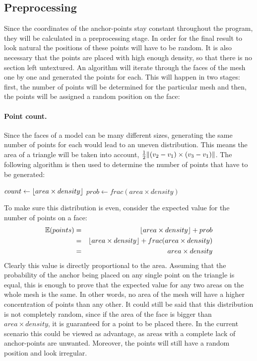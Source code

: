 \documentclass[a4paper, 12pt]{article}
\DeclarePairedDelimiter{\norm}{\lVert}{\rVert}
\DeclarePairedDelimiter{\floor}{\lfloor}{\rfloor}
\begin{document}
\subsection{Preprocessing}

Since the coordinates of the anchor-points stay constant throughout the program, they will be calculated in a preprocessing stage. In order for the final result to look natural the positions of these points will have to be random. It is also necessary that the points are placed with high enough density, so that there is no section left untextured. An algorithm will iterate through the faces of the mesh one by one and generated the points for each. This will happen in two stages: first, the number of points will be determined for the particular mesh and then, the points will be assigned a random position on the face:

\paragraph{Point count.}
Since the faces of a model can be many different sizes, generating the same number of points for each would lead to an uneven distribution. This means the area of a triangle will be taken into account, $\frac{1}{2}\norm{(v_2-v_1) \times (v_3-v_1)}$. The following algorithm is then used to determine the number of points that have to be generated:

\begin{algorithm}[H]
$count \leftarrow \floor{area \times density}$\;
$prob \leftarrow frac(area \times density)$ 
\end{algorithm}

To make sure this distribution is even, consider the expected value for the number of points on a face:
\begin{eqnarray*}
\mathbb{E} (points) & = & \floor{area \times density} + prob \\
& = & \floor{area \times density} + frac(area \times density) \\
& = & area \times density
\end{eqnarray*}
Clearly this value is directly proportional to the area. Assuming that the probability of the anchor being placed on any single point on the triangle is equal, this is enough to prove that the expected value for any two areas on the whole mesh is the same. In other words, no area of the mesh will have a higher concentration of points than any other. It could still be said that this distribution is not completely random, since if the area of the face is bigger than $area \times density$, it is guaranteed for a point to be placed there. In the current scenario this could be viewed as advantage, as areas with a complete lack of anchor-points are unwanted. Moreover, the points will still have a random position and look irregular.
\end{document}
